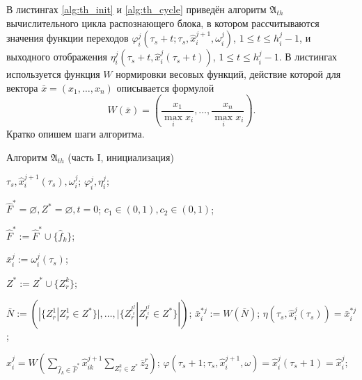 В листингах \ref{alg:th_init} и \ref{alg:th_cycle} приведён алгоритм $\mathfrak{A}_{th}$ вычислительного цикла распознающего блока, в котором рассчитываются значения функции переходов $\varphi_i^j(\tau_s+t;\tau_s,\hat{x}_i^{j+1},\omega_i^j)$, $1\leqslant{t}\leqslant h_i^j-1$, и выходного отображения $\eta_i^j(\tau_s+t,\hat{x}_i^j(\tau_s+t))$, $1\leqslant{t}\leqslant h_i^j-1$. В листингах используется функция $W$ нормировки весовых функций, действие которой для вектора $\bar x=(x_1,\dots,x_n)$ описывается формулой
\[
	W(\bar x)=\left(\frac{x_1}{\max\limits_i x_i},\dots,\frac{x_n}{\max\limits_i x_i}\right).
\] 
Кратко опишем шаги алгоритма.

\begin{algorithm}[H]
	\caption{Алгоритм $\mathfrak{A}_{th}$ (часть I, инициализация)}\label{alg:th_init}
	\begin{algorithmic}[1]
		\Require $\tau_s, \hat{x}_i^{j+1}(\tau_s), \omega_i^j$;
		\Ensure $\varphi_i^j, \eta_i^j$;
		
		\State $\hat{F}^*=\varnothing,Z^*=\varnothing,t=0$;
		\State $c_1\in(0,1), c_2\in(0,1)$;
		
		 \label{alst:init_start}
			 \label{alst:select_f}
				\State $\hat{F}^*:=\hat{F}^*\cup\{\hat{f}_k\}$;
			\EndIf
		\EndFor
		
		\State $\bar x_i^j:=\omega_i^j(\tau_s)$;
		
				 \label{alst:select_z}
					\State $Z^*:=Z^*\cup\{Z_r^k\}$;
				\EndIf
			\EndFor
		\EndFor
		
		\State $\bar N:=(|\{Z_r^1|Z_r^1\in Z^*\}|,\dots,|\{Z_r^{l_i^j}|Z_r^{l_i^j}\in Z^*\}|)$; \label{alst:init_calc_out1}
		\State $\bar{x}_i^{*j}:=W(\bar N)$; \label{init_alst:calc_out2}
		\State $\eta(\tau_s, \hat{x}_i^j(\tau_s))=\bar{x}_i^{*j}$; \label{alst:init_calc_out3}
		
		\State $\hat x_i^j=W(\sum_{\hat f_k\in\hat F^*}\hat x_{ik}^{j+1}\sum_{Z_r^k\in Z^*}\bar z_2^r)$; \label{alst:init_state}
		\State $\varphi(\tau_s+1;\tau_s,\hat{x}_i^{j+1}, \omega)=\hat{x}_i^j(\tau_s+1)=\hat{x}_i^j$;\label{alst:init_end}			
	\end{algorithmic}
\end{algorithm}

